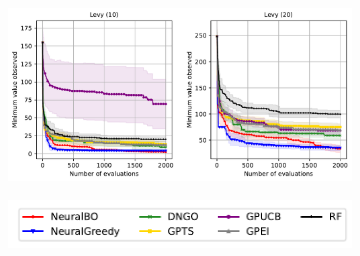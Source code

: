 \begin{figure}[htbp]
\begin{subfigure}[b]{0.8\textwidth}
        \centering
        \includegraphics[width=\textwidth]{Figures/Neural-BO/L1.pdf}
    \end{subfigure}
    \begin{subfigure}[b]{0.8\textwidth} 
        \centering
        \includegraphics[width=\textwidth]{Figures/Neural-BO/baselines.pdf}
    \end{subfigure}
    \label{fig:neural-bo_synthetic_1}

\end{figure}

